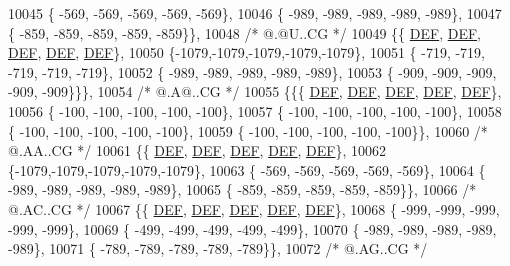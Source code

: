 \begin{DoxyCode}
10045 \{ -569, -569, -569, -569, -569\},
10046 \{ -989, -989, -989, -989, -989\},
10047 \{ -859, -859, -859, -859, -859\}\},
10048 \textcolor{comment}{/*  @.@U..CG */}
10049 \{\{  \mbox{\hyperlink{1_88_84__epars_8h_a397419fc12b37ed479c8abb9d444d843}{DEF}},  \mbox{\hyperlink{1_88_84__epars_8h_a397419fc12b37ed479c8abb9d444d843}{DEF}},  \mbox{\hyperlink{1_88_84__epars_8h_a397419fc12b37ed479c8abb9d444d843}{DEF}},  \mbox{\hyperlink{1_88_84__epars_8h_a397419fc12b37ed479c8abb9d444d843}{DEF}},  \mbox{\hyperlink{1_88_84__epars_8h_a397419fc12b37ed479c8abb9d444d843}{DEF}}\},
10050 \{-1079,-1079,-1079,-1079,-1079\},
10051 \{ -719, -719, -719, -719, -719\},
10052 \{ -989, -989, -989, -989, -989\},
10053 \{ -909, -909, -909, -909, -909\}\}\},
10054 \textcolor{comment}{/*  @.A@..CG */}
10055 \{\{\{  \mbox{\hyperlink{1_88_84__epars_8h_a397419fc12b37ed479c8abb9d444d843}{DEF}},  \mbox{\hyperlink{1_88_84__epars_8h_a397419fc12b37ed479c8abb9d444d843}{DEF}},  \mbox{\hyperlink{1_88_84__epars_8h_a397419fc12b37ed479c8abb9d444d843}{DEF}},  \mbox{\hyperlink{1_88_84__epars_8h_a397419fc12b37ed479c8abb9d444d843}{DEF}},  \mbox{\hyperlink{1_88_84__epars_8h_a397419fc12b37ed479c8abb9d444d843}{DEF}}\},
10056 \{ -100, -100, -100, -100, -100\},
10057 \{ -100, -100, -100, -100, -100\},
10058 \{ -100, -100, -100, -100, -100\},
10059 \{ -100, -100, -100, -100, -100\}\},
10060 \textcolor{comment}{/*  @.AA..CG */}
10061 \{\{  \mbox{\hyperlink{1_88_84__epars_8h_a397419fc12b37ed479c8abb9d444d843}{DEF}},  \mbox{\hyperlink{1_88_84__epars_8h_a397419fc12b37ed479c8abb9d444d843}{DEF}},  \mbox{\hyperlink{1_88_84__epars_8h_a397419fc12b37ed479c8abb9d444d843}{DEF}},  \mbox{\hyperlink{1_88_84__epars_8h_a397419fc12b37ed479c8abb9d444d843}{DEF}},  \mbox{\hyperlink{1_88_84__epars_8h_a397419fc12b37ed479c8abb9d444d843}{DEF}}\},
10062 \{-1079,-1079,-1079,-1079,-1079\},
10063 \{ -569, -569, -569, -569, -569\},
10064 \{ -989, -989, -989, -989, -989\},
10065 \{ -859, -859, -859, -859, -859\}\},
10066 \textcolor{comment}{/*  @.AC..CG */}
10067 \{\{  \mbox{\hyperlink{1_88_84__epars_8h_a397419fc12b37ed479c8abb9d444d843}{DEF}},  \mbox{\hyperlink{1_88_84__epars_8h_a397419fc12b37ed479c8abb9d444d843}{DEF}},  \mbox{\hyperlink{1_88_84__epars_8h_a397419fc12b37ed479c8abb9d444d843}{DEF}},  \mbox{\hyperlink{1_88_84__epars_8h_a397419fc12b37ed479c8abb9d444d843}{DEF}},  \mbox{\hyperlink{1_88_84__epars_8h_a397419fc12b37ed479c8abb9d444d843}{DEF}}\},
10068 \{ -999, -999, -999, -999, -999\},
10069 \{ -499, -499, -499, -499, -499\},
10070 \{ -989, -989, -989, -989, -989\},
10071 \{ -789, -789, -789, -789, -789\}\},
10072 \textcolor{comment}{/*  @.AG..CG */}

\end{DoxyCode}
